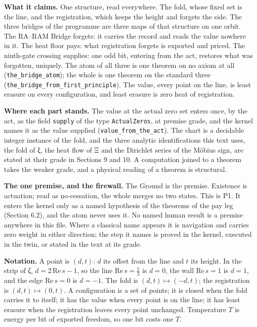 \documentclass[10pt,twocolumn]{article}
\begin{document}
\textbf{What it claims.} One structure, read everywhere. The fold, whose
fixed set is the line, and the registration, which keeps the height and
forgets the side. The three bridges of the programme are three maps of
that structure on one orbit. The RA--RAM Bridge forgets: it carries the
record and reads the value nowhere in it. The heat floor pays: what
registration forgets is exported and priced. The ninth-gate crossing
supplies: one odd bit, entering from the act, restores what was
forgotten, uniquely. The atom of all three is one theorem on no axiom at
all (\texttt{the\_\allowbreak{}bridge\_\allowbreak{}atom}); the whole is one theorem on the
standard three (\texttt{the\_\allowbreak{}bridge\_\allowbreak{}from\_\allowbreak{}first\_\allowbreak{}principle}). The
value, every point on the line, is least erasure on every configuration,
and least erasure is zero heat of registration.

\textbf{Where each part stands.} The value at the actual zero set enters
once, by the act, as the field \texttt{supply} of the type
\texttt{ActualZeros}, at premise grade, and the kernel names it as the
value supplied (\texttt{value\_\allowbreak{}from\_\allowbreak{}the\_\allowbreak{}act}). The chart is a
decidable integer instance of the fold, and the three analytic
identifications this text uses, the fold of ξ, the heat flow of Ξ and
the Dirichlet series of the Möbius sign, are stated at their grade in
Sections 9 and 10. A computation joined to a theorem takes the weaker
grade, and a physical reading of a theorem is structural.

\textbf{The one premise, and the firewall.} The Ground is the premise.
Existence is actuation; read as no-cessation, the whole merges no two
states. This is P1. It enters the kernel only as a named hypothesis of
the theorems of the pay leg (Section 6.2), and the atom never uses it.
No named human result is a premise anywhere in this file. Where a
classical name appears it is navigation and carries zero weight in
either direction; the step it names is proved in the kernel, executed in
the twin, or stated in the text at its grade.

\textbf{Notation.} A point is \((d,t)\): \(d\) its offset from the line
and \(t\) its height. In the strip of ζ, \(d=2\,\mathrm{Re}\,s-1\), so
the line \(\mathrm{Re}\,s=\tfrac12\) is \(d=0\), the wall
\(\mathrm{Re}\,s=1\) is \(d=1\), and the edge \(\mathrm{Re}\,s=0\) is
\(d=-1\). The fold is \((d,t)\mapsto(-d,t)\); the registration is
\((d,t)\mapsto(0,t)\). A configuration is a set of points; it is closed
when the fold carries it to itself; it has the value when every point is
on the line; it has least erasure when the registration leaves every
point unchanged. Temperature \(T\) is energy per bit of exported
freedom, so one bit costs one \(T\).
\end{document}
